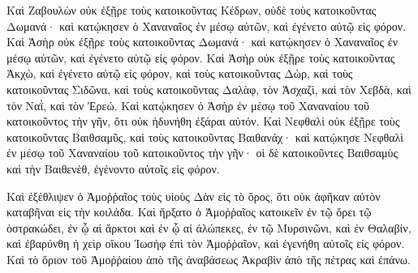 {Καὶ Ζαβουλὼν οὐκ ἐξῇρε τοὺς κατοικοῦντας Κέδρων, οὐδὲ τοὺς κατοικοῦντας Δωμανά· καὶ κατῴκησεν ὁ Χαναναῖος ἐν μέσῳ αὐτῶν, καὶ ἐγένετο αὐτῷ εἰς φόρον. Καὶ Ἀσὴρ οὐκ ἐξῇρε τοὺς κατοικοῦντας Δωμανά· καὶ κατῴκησεν ὁ Χαναναῖος ἐν μέσῳ αὐτῶν, καὶ ἐγένετο αὐτῷ εἰς φόρον.
Καὶ Ἀσὴρ οὐκ ἐξῇρε τοὺς κατοικοῦντας Ἀκχὼ, καὶ ἐγένετο αὐτῷ εἰς φόρον, καὶ τοὺς κατοικοῦντας Δὼρ, καὶ τοὺς κατοικοῦντας Σιδῶνα, καὶ τοὺς κατοικοῦντας Δαλὰφ, τὸν Ἀσχαζὶ, καὶ τὸν Χεβδὰ, καὶ τὸν Ναῒ, καὶ τὸν Ἐρεώ.
Καὶ κατῴκησεν ὁ Ἀσὴρ ἐν μέσῳ τοῦ Χαναναίου τοῦ κατοικοῦντος τὴν γῆν, ὅτι οὐκ ἠδυνήθη ἐξάραι αὐτόν.
Καὶ Νεφθαλὶ οὐκ ἐξῇρε τοὺς κατοικοῦντας Βαιθσαμῦς, καὶ τοὺς κατοικοῦντας Βαιθανάχ· καὶ κατῴκησε Νεφθαλὶ ἐν μέσῳ τοῦ Χαναναίου τοῦ κατοικοῦντος τὴν γῆν· οἱ δὲ κατοικοῦντες Βαιθσαμὺς καὶ τὴν Βαιθενὲθ, ἐγένοντο αὐτοῖς εἰς φόρον.
\par }{\PP {}Καὶ ἐξέθλιψεν ὁ Ἀμοῤῥαῖος τοὺς υἱοὺς Δὰν εἰς τὸ ὄρος, ὅτι οὐκ ἀφῆκαν αὐτὸν καταβῆναι εἰς τὴν κοιλάδα.
Καὶ ἤρξατο ὁ Ἀμοῤῥαῖος κατοικεῖν ἐν τῷ ὄρει τῷ ὀστρακώδει, ἐν ᾧ αἱ ἅρκτοι καὶ ἐν ᾧ αἱ ἀλώπεκες, ἐν τῷ Μυρσινῶνι, καὶ ἐν Θαλαβίν, καὶ ἐβαρύνθη ἡ χεὶρ οἴκου Ἰωσὴφ ἐπὶ τὸν Ἀμοῤῥαῖον, καὶ ἐγενήθη αὐτοῖς εἰς φόρον.
Καὶ τὸ ὅριον τοῦ Ἀμοῤῥαίου ἀπὸ τῆς ἀναβάσεως Ἀκραβὶν ἀπὸ τῆς πέτρας καὶ ἐπάνω.

}
